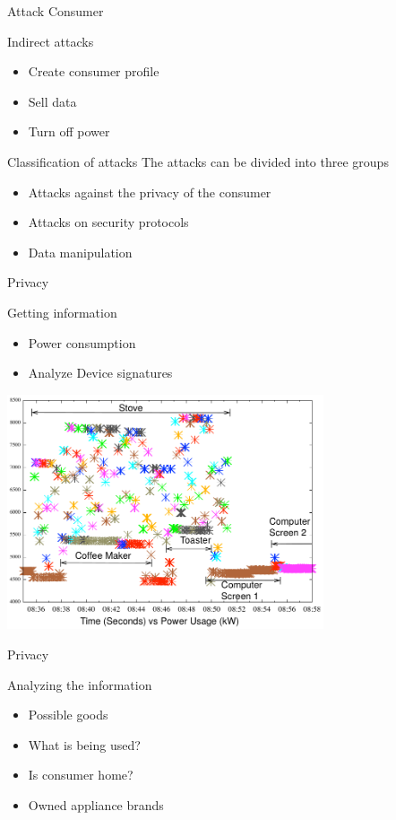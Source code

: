 \begin{frame}{Attack Consumer}
  \begin{block}{Indirect attacks}
    \begin{itemize}
      \item Create consumer profile
      \item Sell data
      \item Turn off power
    \end{itemize}
  \end{block}
\end{frame}

\begin{frame}{Classification of attacks}
  The attacks can be divided into three groups
  \begin{itemize}
    \item Attacks against the privacy of the consumer
    \item Attacks on security protocols
    \item Data manipulation
  \end{itemize}
\end{frame}

\begin{frame}{Privacy}
  \begin{block}{Getting information}
    \begin{itemize}
      \item Power consumption
      \item Analyze Device signatures
    \end{itemize}
  \end{block}

  \includegraphics[width=0.7\textwidth]{graphics/detailed.png}
\end{frame}

\begin{frame}{Privacy}
  \begin{block}{Analyzing the information}
    \begin{itemize}
      \item Possible goods
      \item What is being used?
      \item Is consumer home?
      \item Owned appliance brands
    \end{itemize}
\end{block}

\end{frame}

